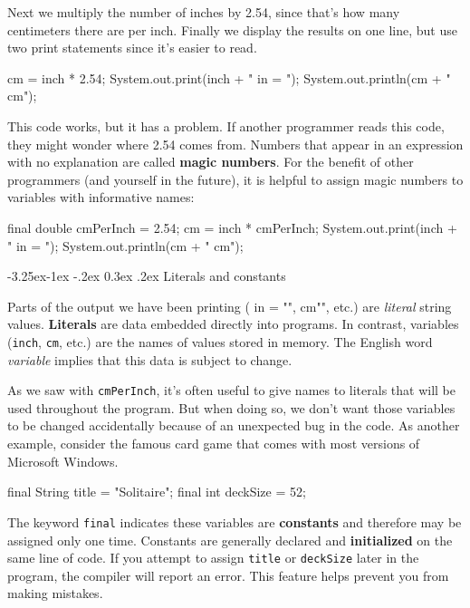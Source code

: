\documentclass[12pt]{book}
\makeatletter
\theoremstyle{exercise}
\newcommand{\java}[1]{\verb"#1"}
\renewcommand\subsection{\@startsection{subsection}{2}{\z@}%
    {-3.25ex\@plus -1ex \@minus -.2ex}%
    {0.3ex \@plus .2ex}%
    {\normalfont\large\bfseries}}
\newcommand{\java}[1]{\lstinline{#1}} %
\makeatother
\begin{document}
Next we multiply the number of inches by 2.54, since that's how many centimeters there are per inch.
Finally we display the results on one line, but use two print statements since it's easier to read.

\begin{code}
    cm = inch * 2.54;
    System.out.print(inch + " in = ");
    System.out.println(cm + " cm");
\end{code}


This code works, but it has a problem.
If another programmer reads this code, they might wonder where 2.54 comes from.
Numbers that appear in an expression with no explanation are called {\bf magic numbers}.
For the benefit of other programmers (and yourself in the future), it is helpful to assign magic numbers to variables with informative names:

\begin{code}
    final double cmPerInch = 2.54;
    cm = inch * cmPerInch;
    System.out.print(inch + " in = ");
    System.out.println(cm + " cm");
\end{code}

\subsection{Literals and constants}


Parts of the output we have been printing (\java{" in = "}, \java{" cm"}, etc.) are {\em literal} string values.
{\bf Literals} are data embedded directly into programs.
In contrast, variables (\java{inch}, \java{cm}, etc.) are the names of values stored in memory.
The English word {\em variable} implies that this data is subject to change.

As we saw with \java{cmPerInch}, it's often useful to give names to literals that will be used throughout the program.
But when doing so, we don't want those variables to be changed accidentally because of an unexpected bug in the code.
As another example, consider the famous card game that comes with most versions of Microsoft Windows.

\begin{code}
    final String title = "Solitaire";
    final int deckSize = 52;
\end{code}


The keyword \java{final} indicates these variables are {\bf constants} and therefore may be assigned only one time.
Constants are generally declared and {\bf initialized} on the same line of code.
If you attempt to assign \java{title} or \java{deckSize} later in the program, the compiler will report an error.
This feature helps prevent you from making mistakes.
\end{document}
